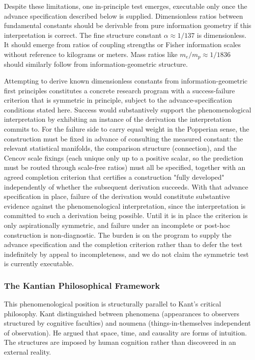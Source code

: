 \documentclass[11pt]{article}
\begin{document}
Despite these limitations, one in-principle test emerges, executable only once the advance specification described below is supplied. Dimensionless ratios between fundamental constants should be derivable from pure information geometry if this interpretation is correct. The fine structure constant $\alpha \approx 1/137$ is dimensionless.  It should emerge from ratios of coupling strengths or Fisher information scales without reference to kilograms or meters. Mass ratios like $m_e/m_p \approx 1/1836$ should similarly follow from information-geometric structure.

Attempting to derive known dimensionless constants from information-geometric first principles constitutes a concrete research program with a success-failure criterion that is symmetric in principle, subject to the advance-specification conditions stated here. Success would substantively support the phenomenological interpretation by exhibiting an instance of the derivation the interpretation commits to. For the failure side to carry equal weight in the Popperian sense, the construction must be fixed in advance of consulting the measured constant: the relevant statistical manifolds, the comparison structure (connection), and the Cencov scale fixings (each unique only up to a positive scalar, so the prediction must be routed through scale-free ratios) must all be specified, together with an agreed completion criterion that certifies a construction "fully developed" independently of whether the subsequent derivation succeeds. With that advance specification in place, failure of the derivation would constitute substantive evidence against the phenomenological interpretation, since the interpretation is committed to such a derivation being possible. Until it is in place the criterion is only aspirationally symmetric, and failure under an incomplete or post-hoc construction is non-diagnostic. The burden is on the program to supply the advance specification and the completion criterion rather than to defer the test indefinitely by appeal to incompleteness, and we do not claim the symmetric test is currently executable.

\subsubsection{The Kantian Philosophical Framework}

This phenomenological position is structurally parallel to Kant's critical philosophy. Kant distinguished between phenomena (appearances to observers structured by cognitive faculties) and noumena (things-in-themselves independent of observation). He argued that space, time, and causality are forms of intuition.  The structures are imposed by human cognition rather than discovered in an external reality.
\end{document}
